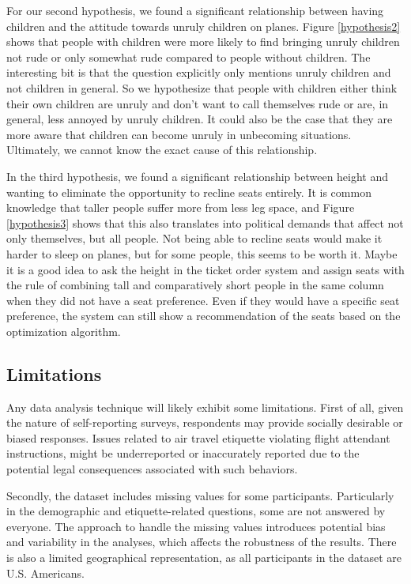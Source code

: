 \documentclass{article}
\theoremstyle{plain}
\theoremstyle{definition}
\theoremstyle{remark}
\begin{document}
For our second hypothesis, we found a significant relationship between having children and the attitude towards unruly children on planes. Figure \ref{hypothesis2} shows that people with children were more likely to find bringing unruly children not rude or only somewhat rude compared to people without children. The interesting bit is that the question explicitly only mentions unruly children and not children in general. So we hypothesize that people with children either think their own children are unruly and don't want to call themselves rude or are, in general, less annoyed by unruly children. It could also be the case that they are more aware that children can become unruly in unbecoming situations. Ultimately, we cannot know the exact cause of this relationship. 

In the third hypothesis, we found a significant relationship between height and wanting to eliminate the opportunity to recline seats entirely. It is common knowledge that taller people suffer more from less leg space, and Figure \ref{hypothesis3} shows that this also translates into political demands that affect not only themselves, but all people. Not being able to recline seats would make it harder to sleep on planes, but for some people, this seems to be worth it. Maybe it is a good idea to ask the height in the ticket order system and assign seats with the rule of combining tall and comparatively short people in the same column when they did not have a seat preference. Even if they would have a specific seat preference, the system can still show a recommendation of the seats based on the optimization algorithm.

\subsection{Limitations}
Any data analysis technique will likely exhibit some limitations. First of all, given the nature of self-reporting surveys, respondents may provide socially desirable or biased responses. Issues related to air travel etiquette violating flight attendant instructions, might be underreported or inaccurately reported due to the potential legal consequences associated with such behaviors.

Secondly, the dataset includes missing values for some participants. Particularly in the demographic and etiquette-related questions, some are not answered by everyone. The approach to handle the missing values introduces potential bias and variability in the analyses, which affects the robustness of the results. There is also a limited geographical representation, as all participants in the dataset are U.S. Americans. 
\end{document}
